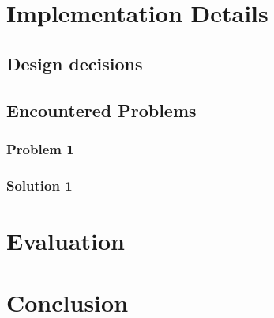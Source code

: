 \documentclass[
	accentcolor=1c,%
	type=intern,
	marginpar=false,
	ruledheaders=section,
	class=report,
	BCOR=5mm,
      parskip=half-,
	fontsize=10pt
	]{tudapub}
\begin{document}
	\newpage
	\section{Implementation Details}

	\subsection{Design decisions}


	\subsection{Encountered Problems}

	\subsubsection{Problem 1}

	\subsubsection{Solution 1}


	\newpage
	\section{Evaluation}

	\newpage
	\section{Conclusion}
\end{document}
